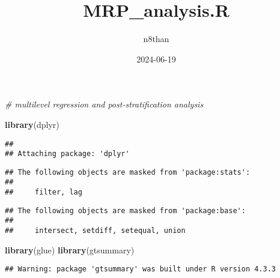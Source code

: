 \documentclass[
]{article}
\title{MRP\_analysis.R}
\author{n8than}
\date{2024-06-19}
\newenvironment{Shaded}{\begin{snugshade}}{\end{snugshade}}
\newcommand{\CommentTok}[1]{\textcolor[rgb]{0.56,0.35,0.01}{\textit{#1}}}
\newcommand{\FunctionTok}[1]{\textcolor[rgb]{0.13,0.29,0.53}{\textbf{#1}}}
\newcommand{\NormalTok}[1]{#1}
\begin{document}
\maketitle

\begin{Shaded}
\begin{Highlighting}[]
\CommentTok{\# multilevel regression and post{-}stratification analysis}

\FunctionTok{library}\NormalTok{(dplyr)}
\end{Highlighting}
\end{Shaded}

\begin{verbatim}
## 
## Attaching package: 'dplyr'
\end{verbatim}

\begin{verbatim}
## The following objects are masked from 'package:stats':
## 
##     filter, lag
\end{verbatim}

\begin{verbatim}
## The following objects are masked from 'package:base':
## 
##     intersect, setdiff, setequal, union
\end{verbatim}

\begin{Shaded}
\begin{Highlighting}[]
\FunctionTok{library}\NormalTok{(glue)}
\FunctionTok{library}\NormalTok{(gtsummary)}
\end{Highlighting}
\end{Shaded}

\begin{verbatim}
## Warning: package 'gtsummary' was built under R version 4.3.3
\end{verbatim}
\end{document}

